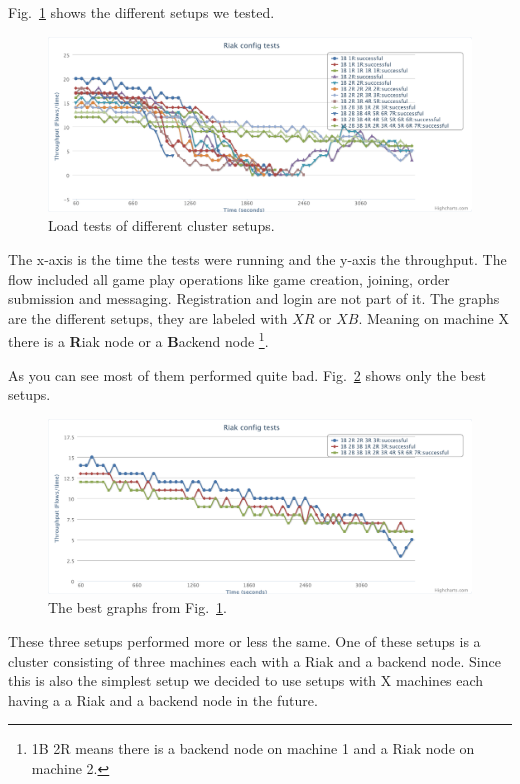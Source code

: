 \documentclass[11pt,a4paper]{report}
\begin{document}
Fig.~\ref{fig:load_test:setup} shows the different setups we tested.
\begin{figure}[htbp!]
 \hspace{-2.5cm}
 \includegraphics[width=18cm]{./graphics/Load_test-setup.pdf}
 \caption{Load tests of different cluster setups.}
 \label{fig:load_test:setup}
\end{figure}
The x-axis is the time the tests were running and the y-axis the throughput.
The flow included all game play operations like game creation, joining,
order submission and messaging.
Registration and login are not part of it.
The graphs are the different setups, they are labeled with $XR$ or $XB$.
Meaning on machine X there is a {\bf R}iak node or a {\bf B}ackend node
\footnote{1B 2R means there is a backend node on machine 1 and a Riak node on machine 2.}.

As you can see most of them performed quite bad.
Fig.~\ref{fig:load_test:setup2} shows only the best setups.
\begin{figure}[htbp!]
 \hspace{-2.5cm}
 \includegraphics[width=18cm]{./graphics/Load_test-setup2.pdf}
 \caption{The best graphs from Fig.~\ref{fig:load_test:setup}.}
 \label{fig:load_test:setup2}
\end{figure}
These three setups performed more or less the same.
One of these setups is a cluster consisting of three machines each with a Riak and a backend node.
Since this is also the simplest setup we decided to use setups with X machines
each having a a Riak and a backend node in the future.
\end{document}
